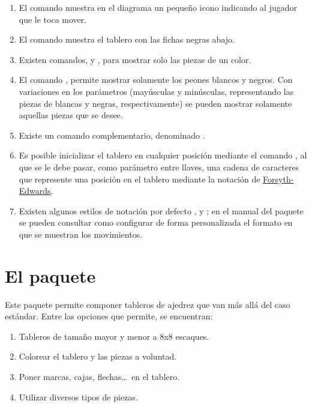 \documentclass[a4paper,10pt, twocolumn]{article}
\newcommand{\mi}[1]{\texttt{#1}} %
\begin{document}
	\begin{enumerate}
		\item El comando \mi{\mover} muestra en el diagrama un pequeño icono indicando al jugador que le toca mover.
		\item El comando \mi{\showinverseboard} muestra el tablero con las fichas negras abajo.
		\item Existen comandos, \mi{\showonlywhite} y \mi{\showonlyblack}, para mostrar solo las piezas de un color.
		\item El comando \mi{}, permite mostrar solamente los peones blancos y negros. Con variaciones en los parámetros (mayúsculas y minúsculas, representando las piezas de blancas y negras, respectivamente) se pueden mostrar solamente aquellas piezas que se desee.
		\item Existe un comando complementario, denominado \mi{}.
		\item Es posible inicializar el tablero en cualquier posición mediante el comando \mi{\fenboard}, al que se le debe pasar, como parámetro entre llaves, una cadena de caracteres que represente una posición en el tablero mediante la notación de \href{https://es.wikipedia.org/wiki/Notaci%C3%B3n_de_Forsyth-Edwards}{Forsyth-Edwards}.
		\item Existen algunos estilos de notación por defecto \mi{\styleA}, \mi{\styleB} y \mi{\styleC}; en el manual del paquete se pueden consultar como configurar de forma personalizada el formato en que se muestran los movimientos.
	\end{enumerate}
	


    

	\section{El paquete }
	
    Este paquete permite componer tableros de ajedrez que van más allá del caso estándar. Entre las opciones que permite, se encuentran:
    
    \begin{enumerate}
        \item Tableros de tamaño mayor y menor a 8x8 escaques.
        \item Colorear el tablero y las piezas a voluntad.
        \item Poner marcas, cajas, flechas\ldots\ en el tablero.
        \item Utilizar diversos tipos de piezas.
    \end{enumerate}
	
\end{document}
